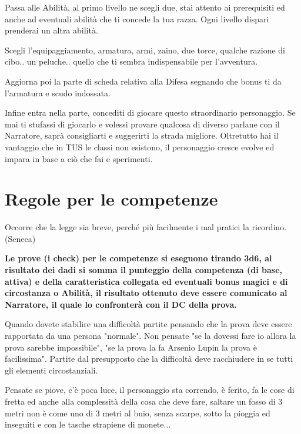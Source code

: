 \documentclass[a4paper,11pt,twoside,openany]{book}
\begin{document}
Passa alle Abilità, al primo livello ne scegli due, stai attento ai prerequisiti ed anche ad eventuali abilità che ti concede la tua razza. Ogni livello dispari prenderai un altra abilità.

Scegli l'equipaggiamento, armatura, armi, zaino, due torce, qualche razione di cibo.. un peluche.. quello che ti sembra indispensabile per l'avventura.

Aggiorna poi la parte di scheda relativa alla Difesa segnando che bonus ti da l'armatura e scudo indossata.

Infine entra nella parte, concediti di giocare questo straordinario personaggio. Se mai ti stufassi di giocarlo e volessi provare qualcosa di diverso parlane con il Narratore, saprà consigliarti e suggerirti la strada migliore.
Oltretutto hai il vantaggio che in TUS le classi non esistono, il personaggio cresce evolve ed impara in base a ciò che fai e sperimenti.

\pagebreak

\section{Regole per le competenze}

\label{regole-per-le-competenze}
\begin{tcolorbox}[enhanced,arc=5pt,boxrule=0.3pt]{
		Occorre che la legge sia breve, perché più facilmente i mal pratici la ricordino. (Seneca)}\end{tcolorbox}\medskip

\textbf{Le prove (i check) per le competenze si eseguono tirando 3d6, al risultato dei dadi si somma il punteggio della competenza (di base, attiva) e della caratteristica collegata ed eventuali bonus magici e di circostanza o Abilità, il risultato ottenuto deve essere comunicato al Narratore, il quale lo confronterà con il DC della prova.}

Quando dovete stabilire una difficoltà partite pensando che la prova deve essere rapportata da una persona "normale". Non pensate "se la dovessi fare io allora la prova sarebbe impossibile", "se la prova la fa Arsenio Lupin la prova è facilissima". Partite dal presupposto che la difficoltà deve racchiudere in se tutti gli elementi circostanziali.

Pensate se piove, c'è poca luce, il personaggio sta correndo, è ferito, fa le cose di fretta ed anche alla complessità della cosa che deve fare, saltare un fosso di 3 metri non è come uno di 3 metri al buio, senza scarpe, sotto la pioggia ed inseguiti e con le tasche strapiene di monete...
\end{document}
